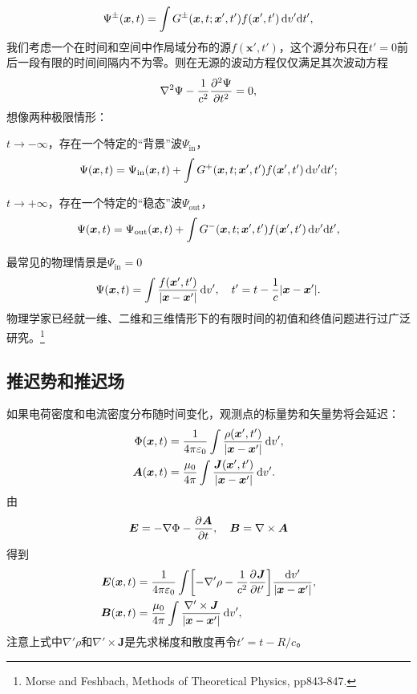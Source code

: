 \[
    \Psi^\pm(\bm x,t)=\int G^\pm(\bm x,t;\bm x',t')f(\bm x',t')\d v'\nd t',
\]
我们考虑一个在时间和空间中作局域分布的源$f(\bm x',t')$，这个源分布只在$t'=0$前后一段有限的时间间隔内不为零。则在无源的波动方程仅仅满足其次波动方程
\[
    \lapla\Psi-\frac1{c^2}\pv[2]\Psi t=0,
\]
想像两种极限情形：
\begin{compactenum}
	\item $t\to-\infty$，存在一个特定的“背景”波$\Psi_\text{in}$，
	\[
        \Psi(\bm x,t)=\Psi_\text{in}(\bm x,t)+\int G^+(\bm x,t;\bm x',t')f(\bm x',t')\d v'\nd t';
    \]
	\item $t\to+\infty$，存在一个特定的“稳态”波$\Psi_\text{out}$，
	\[
        \Psi(\bm x,t)=\Psi_\text{out}(\bm x,t)+\int G^-(\bm x,t;\bm x',t')f(\bm x',t')\d v'\nd t',
    \]
\end{compactenum}
最常见的物理情景是$\Psi_\text{in}=0$%
\begin{equation}
    \Psi(\bm x,t)=\int\frac{f(\bm x',t')}{|\bm x-\bm x'|}\d v',\quad t'=t-\frac1c|\bm x-\bm x'|.
\end{equation}
物理学家已经就一维、二维和三维情形下的有限时间的初值和终值问题进行过广泛研究。\footnote{Morse and Feshbach, Methods of Theoretical Physics, pp843-847.}
\subsection{推迟势和推迟场}
如果电荷密度和电流密度分布随时间变化，观测点的标量势和矢量势将会延迟：
\begin{subequations}
    \begin{align}
        \Phi(\bm x,t)&=\frac1{4\pi\varepsilon_0}\int\frac{\rho(\bm x',t')}{|\bm x-\bm x'|}\d v',\\
        \bm A(\bm x,t)&=\frac{\mu_0}{4\pi}\int\frac{\bm J(\bm x',t')}{|\bm x-\bm x'|}\d v'.
    \end{align}
\end{subequations}
由
\[
    \bm E=-\nabla\Phi-\pv{\bm A}t,\quad\bm B=\curl\bm A
\]
得到
\begin{subequations}
    \begin{align}
        \bm E(\bm x,t)&=\frac1{4\pi\varepsilon_0}\int\biggfkh{-\nabla'\rho-\frac1{c^2}\pv{\bm J}{t'}}\frac{\d v'}{|\bm x-\bm x'|},\\
        \bm B(\bm x,t)&=\frac{\mu_0}{4\pi}\int\frac{\nabla'\times\bm J}{|\bm x-\bm x'|}\d v',
    \end{align}
\end{subequations}
注意上式中$\nabla'\rho$和$\nabla'\times\bm J$是先求梯度和散度再令$t'=t-R/c$。

